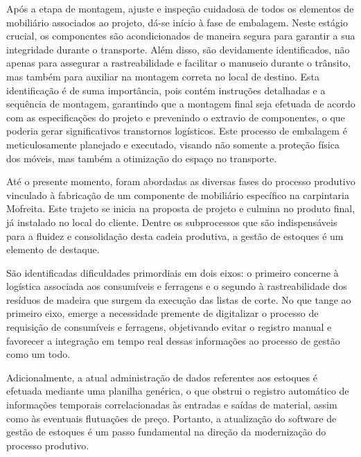 Após a etapa de montagem, ajuste e inspeção cuidadosa de todos os elementos de mobiliário associados ao projeto, dá-se início à fase de embalagem. Neste estágio crucial, os componentes são acondicionados de maneira segura para garantir a sua integridade durante o transporte. Além disso, são devidamente identificados, não apenas para assegurar a rastreabilidade e facilitar o manuseio durante o trânsito, mas também para auxiliar na montagem correta no local de destino. Esta identificação é de suma importância, pois contém instruções detalhadas e a sequência de montagem, garantindo que a montagem final seja efetuada de acordo com as especificações do projeto e prevenindo o extravio de componentes, o que poderia gerar significativos transtornos logísticos. Este processo de embalagem é meticulosamente planejado e executado, visando não somente a proteção física dos móveis, mas também a otimização do espaço no transporte.




Até o presente momento, foram abordadas as diversas fases do processo produtivo vinculado à fabricação de um componente de mobiliário específico na carpintaria Mofreita. Este trajeto se inicia na proposta de projeto e culmina no produto final, já instalado no local do cliente. Dentre os subprocessos que são indispensáveis para a fluidez e consolidação desta cadeia produtiva, a gestão de estoques é um elemento de destaque.

São identificadas dificuldades primordiais em dois eixos: o primeiro concerne à logística associada aos consumíveis e ferragens e o segundo à rastreabilidade dos resíduos de madeira que surgem da execução das listas de corte. No que tange ao primeiro eixo, emerge a necessidade premente de digitalizar o processo de requisição de consumíveis e ferragens, objetivando evitar o registro manual e favorecer a integração em tempo real dessas informações ao processo de gestão como um todo.

Adicionalmente, a atual administração de dados referentes aos estoques é efetuada mediante uma planilha genérica, o que obstrui o registro automático de informações temporais correlacionadas às entradas e saídas de material, assim como às eventuais flutuações de preço. Portanto, a atualização do software de gestão de estoques é um passo fundamental na direção da modernização do processo produtivo.

